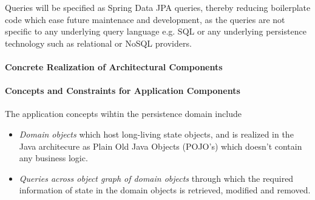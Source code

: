 Queries will be specified as Spring Data JPA queries, thereby reducing 
boilerplate code which ease future maintenace and development, as the queries
are not specific to any underlying query language e.g. SQL or any underlying 
persistence technology such as relational or NoSQL providers.

\paragraph{Concrete Realization of Architectural Components}

\paragraph{Concepts and Constraints for Application Components}
The application concepts wihtin the persistence domain include
\begin{itemize}
	\item \textit{Domain objects} which host long-living state objects, and is realized in the Java architecure as Plain Old Java Objects (POJO's) which doesn't contain any business logic.
	\item \textit{Queries across object graph of domain objects} through which the required information of state in the domain objects is retrieved, modified and removed.
\end{itemize} 